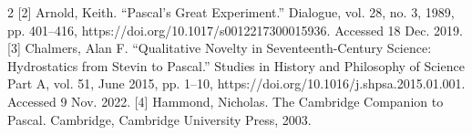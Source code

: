 \begin{multicols}{2}
	[2] Arnold, Keith. “Pascal’s Great Experiment.” Dialogue, vol. 28, no. 3, 1989, pp. 401–416, https://doi.org/10.1017/s0012217300015936. Accessed 18 Dec. 2019.
	[3] Chalmers, Alan F. “Qualitative Novelty in Seventeenth-Century Science: Hydrostatics from Stevin to Pascal.” Studies in History and Philosophy of Science Part A, vol. 51, June 2015, pp. 1–10, https://doi.org/10.1016/j.shpsa.2015.01.001. Accessed 9 Nov. 2022.
	[4] Hammond, Nicholas. The Cambridge Companion to Pascal. Cambridge, Cambridge University Press, 2003.
	
\end{multicols}


